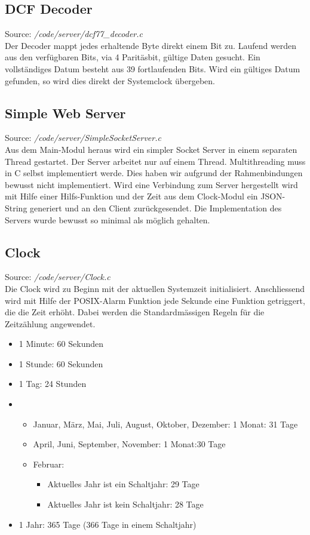 \subsection{DCF Decoder}
Source: \textit{/code/server/dcf77\_decoder.c}\\
Der Decoder mappt jedes erhaltende Byte direkt einem Bit zu. Laufend werden aus den verfügbaren Bits, via 4 Paritäsbit, gültige Daten gesucht. Ein vollständiges Datum besteht aus 39 fortlaufenden Bits.
Wird ein gültiges Datum gefunden, so wird dies direkt der Systemclock übergeben.

\subsection{Simple Web Server}
Source: \textit{/code/server/SimpleSocketServer.c}\\
Aus dem Main-Modul heraus wird ein simpler Socket Server in einem separaten Thread gestartet. Der Server arbeitet nur auf einem Thread. Multithreading muss in C selbst implementiert werde. Dies haben wir aufgrund der Rahmenbindungen bewusst nicht implementiert. Wird eine Verbindung zum Server hergestellt wird mit Hilfe einer Hilfs-Funktion und der Zeit aus dem Clock-Modul ein JSON-String generiert und an den Client zurückgesendet. Die Implementation des Servers wurde bewusst so minimal als möglich gehalten.

\subsection{Clock}
Source: \textit{/code/server/Clock.c}\\
Die Clock wird zu Beginn mit der aktuellen Systemzeit initialisiert. Anschliessend wird mit Hilfe der POSIX-Alarm Funktion jede Sekunde eine Funktion getriggert, die die Zeit erhöht. Dabei werden die Standardmässigen Regeln für die Zeitzählung angewendet.
\begin{itemize}
\item 1 Minute: 60 Sekunden
\item 1 Stunde: 60 Sekunden
\item 1 Tag: 24 Stunden
\item 
\begin{itemize}
\item Januar, März, Mai, Juli, August, Oktober, Dezember: 1 Monat: 31 Tage 
\item April, Juni, September, November: 1 Monat:30 Tage
\item Februar:
\begin{itemize}
\item Aktuelles Jahr ist ein Schaltjahr: 29 Tage 
\item Aktuelles Jahr ist kein Schaltjahr: 28 Tage
\end{itemize}
\end{itemize}
\item 1 Jahr: 365 Tage (366 Tage in einem Schaltjahr)
\end{itemize}

